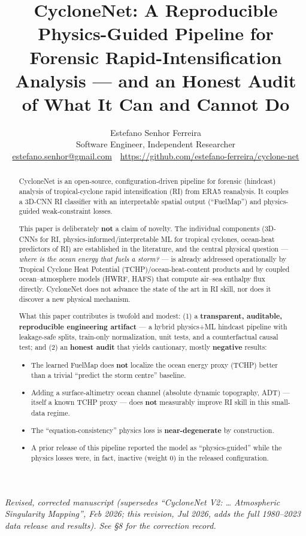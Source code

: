 \documentclass[11pt]{article}
\title{CycloneNet: A Reproducible Physics-Guided Pipeline for Forensic
Rapid-Intensification Analysis --- and an Honest Audit of What It Can and
Cannot Do}
\author{Estefano Senhor Ferreira\\
\small Software Engineer, Independent Researcher\\
\small \href{mailto:estefano.senhor@gmail.com}{estefano.senhor@gmail.com}
\,\textperiodcentered\,
\url{https://github.com/estefano-ferreira/cyclone-net}}
\date{}
\begin{document}
\maketitle

\begin{center}
\small\itshape Revised, corrected manuscript (supersedes ``CycloneNet V2:
\ldots{} Atmospheric Singularity Mapping'', Feb 2026; this revision, Jul 2026,
adds the full 1980--2023 data release and results). See \S8 for the
correction record.
\end{center}

\begin{abstract}
CycloneNet is an open-source, configuration-driven pipeline for forensic
(hindcast) analysis of tropical-cyclone rapid intensification (RI) from ERA5
reanalysis. It couples a 3D-CNN RI classifier with an interpretable spatial
output (``FuelMap'') and physics-guided weak-constraint losses.

This paper is deliberately \textbf{not} a claim of novelty. The individual
components (3D-CNNs for RI, physics-informed/interpretable ML for tropical
cyclones, ocean-heat predictors of RI) are established in the literature, and
the central physical question --- \emph{where is the ocean energy that fuels a
storm?} --- is already addressed operationally by Tropical Cyclone Heat
Potential (TCHP)/ocean-heat-content products and by coupled ocean--atmosphere
models (HWRF, HAFS) that compute air--sea enthalpy flux directly. CycloneNet
does not advance the state of the art in RI skill, nor does it discover a new
physical mechanism.

What this paper contributes is twofold and modest: (1) a \textbf{transparent,
auditable, reproducible engineering artifact} --- a hybrid physics+ML hindcast
pipeline with leakage-safe splits, train-only normalization, unit tests, and a
counterfactual causal test; and (2) an \textbf{honest audit} that yields
cautionary, mostly \textbf{negative} results:
\begin{itemize}
  \item The learned FuelMap does \textbf{not} localize the ocean energy proxy
        (TCHP) better than a trivial ``predict the storm centre'' baseline.
  \item Adding a surface-altimetry ocean channel (absolute dynamic topography,
        ADT) --- itself a known TCHP proxy --- does \textbf{not} measurably
        improve RI skill in this small-data regime.
  \item The ``equation-consistency'' physics loss is \textbf{near-degenerate}
        by construction.
  \item A prior release of this pipeline reported the model as
        ``physics-guided'' while the physics losses were, in fact, inactive
        (weight 0) in the released configuration.
\end{itemize}


\end{abstract}
\end{document}
